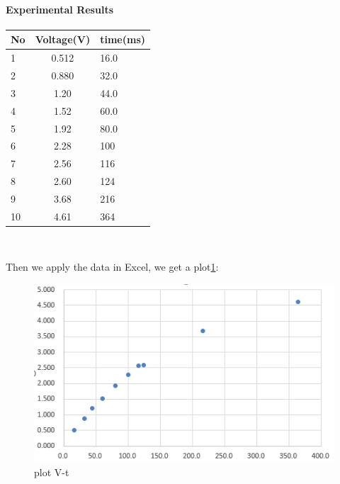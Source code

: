 \paragraph{Experimental Results}
\begin{table}[htbp]\centering
	\renewcommand\arraystretch{1.5}
	\begin{tabular}{lcl}
		\toprule
		No		&Voltage(V)	&time(ms)	\\
		\midrule
		1		&0.512		&16.0		\\
	
		2		&0.880		&32.0		\\
	
		3		&1.20		&44.0		\\
	
		4		&1.52		&60.0		\\
	
		5		&1.92		&80.0		\\
	
		6		&2.28		&100		\\
	
		7		&2.56		&116		\\
	
		8		&2.60		&124		\\
		
		9		&3.68		&216		\\
		
		10		&4.61		&364		\\
		\bottomrule
	\end{tabular}\\
\end{table}
\phantom{ } Then we apply the data in Excel, we get a plot\ref{fig:2.1}:\\
\begin{figure}[htbp]
	\centering %
	\includegraphics[width=\linewidth]{images/2_1.PNG} %
	\caption{plot V-t} %
	\label{fig:2.1} %
\end{figure}\\
